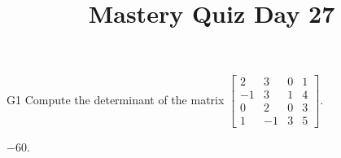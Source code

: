 \documentclass{sbgLAquiz}
\title{Mastery Quiz Day 27 }
\begin{document}
\begin{problem}{G1} 
Compute the determinant of the matrix $\begin{bmatrix} 2 & 3 & 0 & 1 \\ -1 & 3 & 1 & 4 \\ 0 & 2 & 0 & 3 \\ 1 & -1 & 3 & 5 \end{bmatrix}$.
\end{problem}
\begin{solution}
$-60$.
\end{solution}
\end{document}
